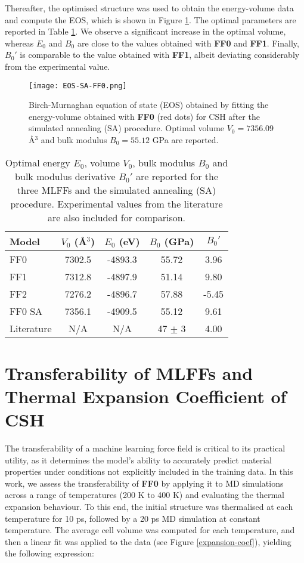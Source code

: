Thereafter, the optimised structure was used to obtain the energy-volume data and compute the EOS, which is shown in Figure \ref{fig:eos-sa-ff0}. The optimal parameters are reported in Table \ref{tab:bulk-params}. We observe a significant increase in the optimal volume, whereas $E_0$ and $B_0$ are close to the values obtained with \textbf{FF0} and \textbf{FF1}. Finally, $B_0'$ is comparable to the value obtained with \textbf{FF1}, albeit deviating considerably from the experimental value.
\begin{figure}[H]
    \centering
    \texttt{[image: EOS-SA-FF0.png]}
    \caption{
    Birch-Murnaghan equation of state (EOS) obtained by fitting the energy-volume obtained with \textbf{FF0} (red dots) for CSH after the simulated annealing (SA) procedure. Optimal volume $V_0=7356.09$ \AA$^3$ and bulk modulus $B_0=55.12$ GPa are reported.
    }
    \label{fig:eos-sa-ff0}
\end{figure}

\begin{table}[h]
\centering
\caption{
    Optimal energy $E_0$, volume $V_0$, bulk modulus $B_0$ and bulk modulus derivative $B_0'$ are reported for the three MLFFs and the simulated annealing (SA) procedure. Experimental values from the literature are also included for comparison.}
\label{tab:bulk-params}
\begin{tabular}{lcccc}
\toprule
\midrule
\textbf{Model} & $V_0$ (\AA$^3$) & $E_0$ (eV) & $B_0$ (GPa) & $B_0'$ \\
\midrule
FF0       & 7302.5   & -4893.3  & 55.72      & 3.96   \\
FF1       & 7312.8   & -4897.9  & 51.14      & 9.80   \\
FF2       & 7276.2   & -4896.7  & 57.88      & -5.45  \\
FF0 SA    & 7356.1   & -4909.5  & 55.12      & 9.61   \\
Literature & N/A     & N/A      & 47 $\pm$ 3 & 4.00      \\
\midrule
\bottomrule
\end{tabular}
\end{table}



\section{Transferability of MLFFs and Thermal Expansion Coefficient of CSH}
\label{sec:transferability}
The transferability of a machine learning force field is critical to its practical utility, as it determines the model's ability to accurately predict material properties under conditions not explicitly included in the training data. In this work, we assess the transferability of \textbf{FF0} by applying it to MD simulations across a range of temperatures (200 K to 400 K) and evaluating the thermal expansion behaviour. To this end, the initial structure was thermalised at each temperature for 10 ps, followed by a 20 ps MD simulation at constant temperature. The average cell volume was computed for each temperature, and then a linear fit\supercite{Xu2007} was applied to the data (see Figure \ref{expansion-coef}), yielding the following expression:

